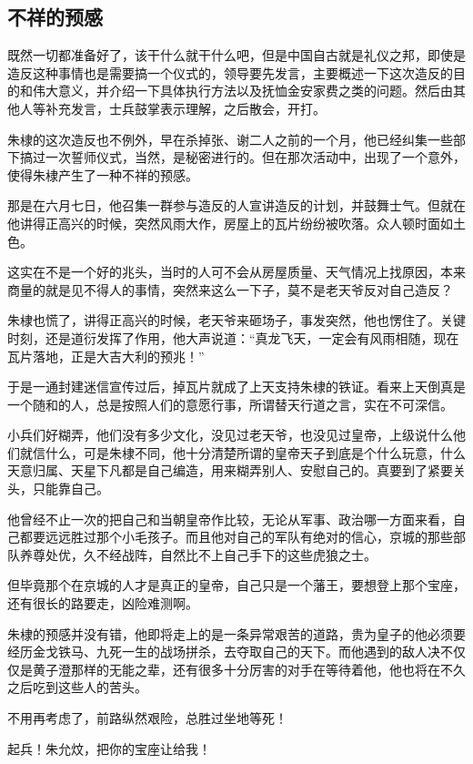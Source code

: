 \begin{multicols}{\theparacolNo}
		\subsection{不祥的预感}
		既然一切都准备好了，该干什么就干什么吧，但是中国自古就是礼仪之邦，即使是造反这种事情也是需要搞一个仪式的，领导要先发言，主要概述一下这次造反的目的和伟大意义，并介绍一下具体执行方法以及抚恤金安家费之类的问题。然后由其他人等补充发言，士兵鼓掌表示理解，之后散会，开打。

		朱棣的这次造反也不例外，早在杀掉张、谢二人之前的一个月，他已经纠集一些部下搞过一次誓师仪式，当然，是秘密进行的。但在那次活动中，出现了一个意外，使得朱棣产生了一种不祥的预感。

		那是在六月七日，他召集一群参与造反的人宣讲造反的计划，并鼓舞士气。但就在他讲得正高兴的时候，突然风雨大作，房屋上的瓦片纷纷被吹落。众人顿时面如土色。

		这实在不是一个好的兆头，当时的人可不会从房屋质量、天气情况上找原因，本来商量的就是见不得人的事情，突然来这么一下子，莫不是老天爷反对自己造反？

		朱棣也慌了，讲得正高兴的时候，老天爷来砸场子，事发突然，他也愣住了。关键时刻，还是道衍发挥了作用，他大声说道：“真龙飞天，一定会有风雨相随，现在瓦片落地，正是大吉大利的预兆！”

		于是一通封建迷信宣传过后，掉瓦片就成了上天支持朱棣的铁证。看来上天倒真是一个随和的人，总是按照人们的意愿行事，所谓替天行道之言，实在不可深信。

		小兵们好糊弄，他们没有多少文化，没见过老天爷，也没见过皇帝，上级说什么他们就信什么，可是朱棣不同，他十分清楚所谓的皇帝天子到底是个什么玩意，什么天意归属、天星下凡都是自己编造，用来糊弄别人、安慰自己的。真要到了紧要关头，只能靠自己。

		他曾经不止一次的把自己和当朝皇帝作比较，无论从军事、政治哪一方面来看，自己都要远远胜过那个小毛孩子。而且他对自己的军队有绝对的信心，京城的那些部队养尊处优，久不经战阵，自然比不上自己手下的这些虎狼之士。

		但毕竟那个在京城的人才是真正的皇帝，自己只是一个藩王，要想登上那个宝座，还有很长的路要走，凶险难测啊。

		朱棣的预感并没有错，他即将走上的是一条异常艰苦的道路，贵为皇子的他必须要经历金戈铁马、九死一生的战场拼杀，去夺取自己的天下。而他遇到的敌人决不仅仅是黄子澄那样的无能之辈，还有很多十分厉害的对手在等待着他，他也将在不久之后吃到这些人的苦头。

		不用再考虑了，前路纵然艰险，总胜过坐地等死！

		起兵！朱允炆，把你的宝座让给我！


\end{multicols}
